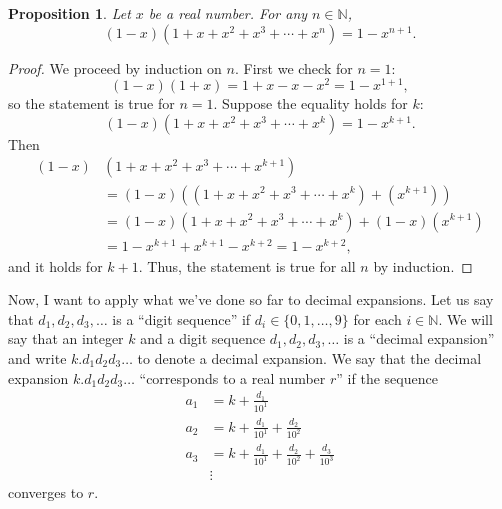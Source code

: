 \documentclass[12pt]{amsart}
\newcommand{\N}{\mathbb{N}}
\numberwithin{equation}{section}
\theoremstyle{plain} %
\newtheorem{prop}[equation]{Proposition}
\theoremstyle{definition}
\theoremstyle{remark}
\begin{document}
\begin{prop} Let $x$ be a real number. For any
$n\in \N$,
\[ (1-x) (1+x +x^2 + x^3 +\cdots + x^n ) = 1 - x^{n+1}.\]
\end{prop}
\begin{proof}
We proceed by induction on $n$. First we check for $n=1$:
\[ (1-x)(1+x) = 1+ x - x -x^2 = 1-x^{1+1},\]
so the statement is true for $n=1$.
Suppose the equality holds for $k$:
\[(1-x) (1+x +x^2 + x^3 +\cdots + x^k ) = 1 - x^{k+1}.\]
Then
\begin{align*}
(1-x)& (1+x +x^2 + x^3 +\cdots + x^{k+1} ) \\
&=(1-x)((1+x +x^2 + x^3 +\cdots + x^{k} )  + (x^{k+1}))
\\&=(1-x)(1+x +x^2 + x^3 +\cdots + x^{k} )  + (1-x) (x^{k+1})
\\&= 1 - x^{k+1} + x^{k+1} - x^{k+2} = 1-x^{k+2},
\end{align*}
and it holds for $k+1$. Thus, the statement is true for all $n$ by induction.
\end{proof}



Now, I want to apply what we've done so far to decimal expansions. Let us say that $d_1,d_2,d_3,\dots$ is a ``digit sequence'' if $d_i\in\{0,1,\dots,9\}$ for each $i\in\N$. We will say that an integer $k$ and a digit sequence $d_1,d_2,d_3,\dots$ is a ``decimal expansion'' and write $k. d_1 d_2 d_3 \dots$ to denote a decimal expansion. We say that the decimal expansion $k. d_1 d_2 d_3 \dots$  ``corresponds to a real number $r$'' if the sequence
\begin{align*}
a_1 &= k + \frac{d_1}{10^1} \\
a_2 &= k + \frac{d_1}{10^1} + \frac{d_2}{10^2} \\
a_3 &= k + \frac{d_1}{10^1} + \frac{d_2}{10^2} + \frac{d_3}{10^3}\\
&\vdots
\end{align*}
converges to $r$.
\end{document}
